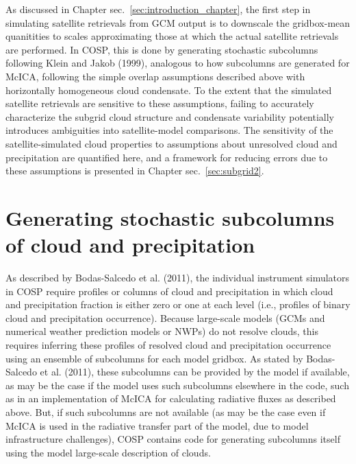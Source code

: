 As discussed in Chapter sec.~\ref{sec:introduction_chapter}, the first
step in simulating satellite retrievals from GCM output is to downscale
the gridbox-mean quanitities to scales approximating those at which the
actual satellite retrievals are performed. In COSP, this is done by
generating stochastic subcolumns following Klein and Jakob (1999),
analogous to how subcolumns are generated for McICA, following the
simple overlap assumptions described above with horizontally homogeneous
cloud condensate. To the extent that the simulated satellite retrievals
are sensitive to these assumptions, failing to accurately characterize
the subgrid cloud structure and condensate variability potentially
introduces ambiguities into satellite-model comparisons. The sensitivity
of the satellite-simulated cloud properties to assumptions about
unresolved cloud and precipitation are quantified here, and a framework
for reducing errors due to these assumptions is presented in Chapter
sec.~\ref{sec:subgrid2}.

\section{Generating stochastic subcolumns of cloud and
precipitation}\label{sec:subgridux5fscops}

As described by Bodas-Salcedo et al. (2011), the individual instrument
simulators in COSP require profiles or columns of cloud and
precipitation in which cloud and precipitation fraction is either zero
or one at each level (i.e., profiles of binary cloud and precipitation
occurrence). Because large-scale models (GCMs and numerical weather
prediction models or NWPs) do not resolve clouds, this requires
inferring these profiles of resolved cloud and precipitation occurrence
using an ensemble of subcolumns for each model gridbox. As stated by
Bodas-Salcedo et al. (2011), these subcolumns can be provided by the
model if available, as may be the case if the model uses such subcolumns
elsewhere in the code, such as in an implementation of McICA for
calculating radiative fluxes as described above. But, if such subcolumns
are not available (as may be the case even if McICA is used in the
radiative transfer part of the model, due to model infrastructure
challenges), COSP contains code for generating subcolumns itself using
the model large-scale description of clouds.

